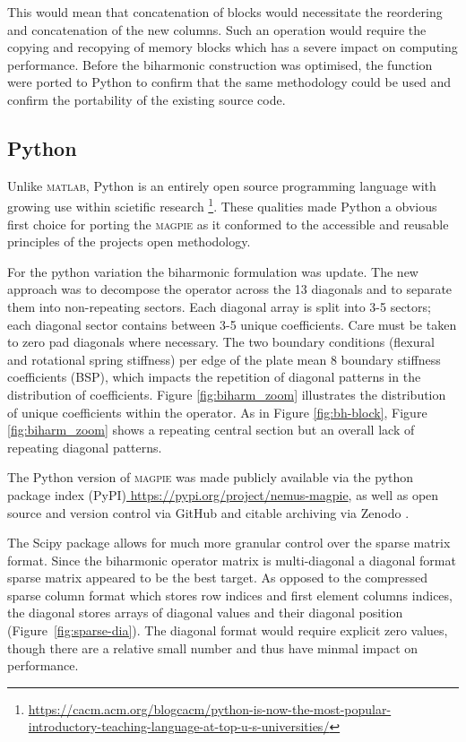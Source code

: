 This would mean that concatenation of blocks would necessitate the reordering and concatenation of the new columns. Such an operation would require the copying and recopying of memory blocks which has a severe impact on computing performance. Before the biharmonic construction was optimised, the function were ported to Python to confirm that the same methodology could be used and confirm the portability of the existing source code.

\subsection{Python}

Unlike \textsc{matlab}, Python is an entirely open source programming language with growing use within scietific research \cite{}\footnote{\url{https://cacm.acm.org/blogcacm/python-is-now-the-most-popular-introductory-teaching-language-at-top-u-s-universities/}}. These qualities made Python a obvious first choice for porting the \textsc{magpie} as it conformed to the accessible and reusable principles of the projects open methodology.

For the python variation the biharmonic formulation was update. The new approach was to decompose the operator across the 13 diagonals and to separate them into non-repeating sectors. Each diagonal array is split into 3-5 sectors; each diagonal sector contains between 3-5 unique coefficients. Care must be taken to zero pad diagonals where necessary. The two boundary conditions (flexural and rotational spring stiffness) per edge of the plate mean 8 boundary stiffness coefficients (BSP), which impacts the repetition of diagonal patterns in the distribution of coefficients. Figure \ref{fig:biharm_zoom} illustrates the distribution of unique coefficients within the operator. As in Figure \ref{fig:bh-block}, Figure \ref{fig:biharm_zoom} shows a repeating central section but an overall lack of repeating diagonal patterns. 

The Python version of \textsc{magpie} was made publicly available via the python package index (PyPI)\url{ https://pypi.org/project/nemus-magpie}, as well as open source and version control via GitHub and citable archiving via Zenodo \cite{magpie_python_2025}.

The Scipy package allows for much more granular control over the sparse matrix format. Since the biharmonic operator matrix is multi-diagonal a diagonal format sparse matrix appeared to be the best target. As opposed to the compressed sparse column format which stores row indices and first element columns indices, the diagonal stores arrays of diagonal values and their diagonal position (Figure~\ref{fig:sparse-dia}). The diagonal format would require explicit zero values, though there are a relative small number and thus have minmal impact on performance.

